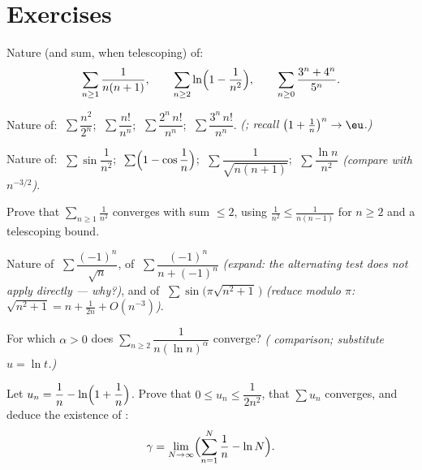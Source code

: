 \section{Exercises}

\begin{exercise}[$\star$]\label{exo:b1:series:1}
Nature (and sum, when telescoping) of:
\[
\sum_{n\geq1} \frac{1}{n(n+1)},
\qquad
\sum_{n\geq2} \ln\Bigl(1 - \frac{1}{n^2}\Bigr),
\qquad
\sum_{n\geq0} \frac{3^n + 4^n}{5^n} .
\]
\end{exercise}

\begin{exercise}[$\star$]\label{exo:b1:series:2}
Nature of: $\;\sum \dfrac{n^2}{2^n}$; $\;\sum \dfrac{n!}{n^n}$;
$\;\sum \dfrac{2^n\,n!}{n^n}$; $\;\sum \dfrac{3^n\,n!}{n^n}$.
\emph{(; recall $\bigl(1 + \frac1n\bigr)^n \to \eu$.)}
\end{exercise}

\begin{exercise}[$\star$]\label{exo:b1:series:3}
Nature of: $\;\sum \sin\dfrac{1}{n^2}$; $\;\sum
\Bigl(1 - \cos\dfrac1n\Bigr)$; $\;\sum \dfrac{1}{\sqrt{n(n+1)}}$;
$\;\sum \dfrac{\ln n}{n^2}$ \emph{(compare with $n^{-3/2}$)}.
\end{exercise}

\begin{exercise}[$\star$]\label{exo:b1:series:4}
Prove that $\sum_{n\geq1} \frac{1}{n^2}$ converges with sum $\leq 2$,
using $\frac{1}{n^2} \leq \frac{1}{n(n-1)}$ for $n \geq 2$ and a
telescoping bound.
\end{exercise}

\begin{exercise}[$\star\star$]\label{exo:b1:series:5}
Nature of $\;\sum \dfrac{(-1)^n}{\sqrt n}$, of $\;\sum
\dfrac{(-1)^n}{n + (-1)^n}$ \emph{(expand: the alternating test does
not apply directly --- why?)}, and of $\;\sum
\sin\bigl(\pi\sqrt{n^2+1}\,\bigr)$ \emph{(reduce modulo $\pi$:
$\sqrt{n^2+1} = n + \frac{1}{2n} + O(n^{-3})$)}.
\end{exercise}

\begin{exercise}[$\star\star$]\label{exo:b1:series:6}
For which $\alpha > 0$ does $\sum_{n \geq 2}
\dfrac{1}{n (\ln n)^{\alpha}}$ converge? \emph{( comparison;
substitute $u = \ln t$.)}
\end{exercise}

\begin{exercise}[$\star\star$]\label{exo:b1:series:7}
Let $u_n = \dfrac{1}{n} - \ln\Bigl(1 + \dfrac1n\Bigr)$. Prove that
$0 \leq u_n \leq \dfrac{1}{2n^2}$, that $\sum u_n$ converges, and
deduce the existence of :
\[
\gamma = \lim_{N \to \infty} \Bigl( \sum_{n=1}^{N} \frac 1n - \ln N
\Bigr) .
\]
\end{exercise}

